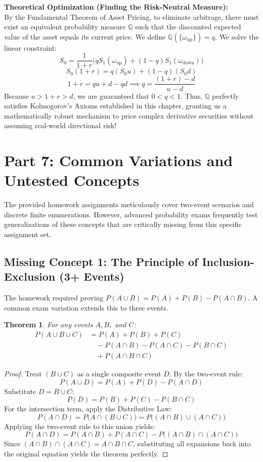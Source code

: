 \documentclass[12pt]{article}
\newtheorem{theorem}{Theorem}[section]
\begin{document}
\noindent \textbf{Theoretical Optimization (Finding the Risk-Neutral Measure):} \\
By the Fundamental Theorem of Asset Pricing, to eliminate arbitrage, there must exist an equivalent probability measure $\mathbb{Q}$ such that the discounted expected value of the asset equals its current price. We define $\mathbb{Q}(\{\omega_{\text{up}}\}) = q$. We solve the linear constraint:
\[ S_0 = \frac{1}{1+r} \Big( q S_1(\omega_{\text{up}}) + (1-q) S_1(\omega_{\text{down}}) \Big) \]
\[ S_0 (1+r) = q(S_0 u) + (1-q)(S_0 d) \]
\[ 1+r = qu + d - qd \implies q = \frac{(1+r) - d}{u - d} \]
Because $u > 1+r > d$, we are guaranteed that $0 < q < 1$. Thus, $\mathbb{Q}$ perfectly satisfies Kolmogorov's Axioms established in this chapter, granting us a mathematically robust mechanism to price complex derivative securities without assuming real-world directional risk!

\newpage
\section{Part 7: Common Variations and Untested Concepts}

The provided homework assignments meticulously cover two-event scenarios and discrete finite enumerations. However, advanced probability exams frequently test generalizations of these concepts that are critically missing from this specific assignment set.

\subsection{Missing Concept 1: The Principle of Inclusion-Exclusion (3+ Events)}
The homework required proving $P(A \cup B) = P(A) + P(B) - P(A \cap B)$. A common exam variation extends this to three events.
\begin{theorem}
For any events $A, B,$ and $C$:
\begin{align*}
P(A \cup B \cup C) &= P(A) + P(B) + P(C) \\
&\quad - P(A \cap B) - P(A \cap C) - P(B \cap C) \\
&\quad + P(A \cap B \cap C)
\end{align*}
\end{theorem}
\begin{proof}
Treat $(B \cup C)$ as a single composite event $D$. By the two-event rule:
\[ P(A \cup D) = P(A) + P(D) - P(A \cap D) \]
Substitute $D = B \cup C$: 
\[ P(D) = P(B) + P(C) - P(B \cap C) \]
For the intersection term, apply the Distributive Law:
\[ P(A \cap D) = P\Big( A \cap (B \cup C) \Big) = P\Big( (A \cap B) \cup (A \cap C) \Big) \]
Applying the two-event rule to this union yields:
\[ P(A \cap D) = P(A \cap B) + P(A \cap C) - P\Big( (A \cap B) \cap (A \cap C) \Big) \]
Since $(A \cap B) \cap (A \cap C) = A \cap B \cap C$, substituting all expansions back into the original equation yields the theorem perfectly.
\end{proof}
\end{document}

